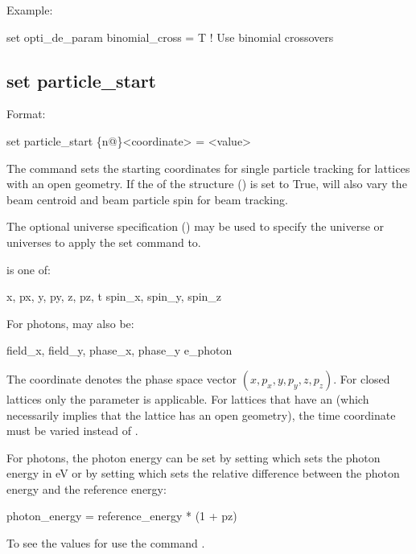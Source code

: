 {{Example:
\begin{example}
  set opti_de_param binomial_cross = T  ! Use binomial crossovers 
\end{example}


\subsection{set particle_start}
\label{s:set.particle.start}

Format:
\begin{example}
  set particle_start \{n@\}<coordinate> = <value>
\end{example}
The  command sets the starting coordinates for single particle tracking for
lattices with an open geometry. If the  of the 
structure () is set to True,  will also vary the beam centroid
and beam particle spin for beam tracking.

The optional  universe specification () may be used to specify the universe
or universes to apply the set command to.

 is one of:
\begin{example}
  x, px, y, py, z, pz, t
  spin_x, spin_y, spin_z
\end{example}
For photons,  may also be:
\begin{example}
  field_x, field_y, phase_x, phase_y
  e_photon
\end{example}
The \vn{*} coordinate denotes the phase space vector $(x, p_x, y, p_y, z, p_z)$.  For closed
lattices only the  parameter is applicable. For lattices that have an  (which
necessarily implies that the lattice has an open geometry), the time  coordinate must be
varied instead of .

For photons, the photon energy can be set by setting  which sets the photon energy in
eV or by setting  which sets the relative difference between the photon energy and the
reference energy:
\begin{example}
  photon_energy = reference_energy * (1 + pz)
\end{example}

To see the values for  use the command .

}}
